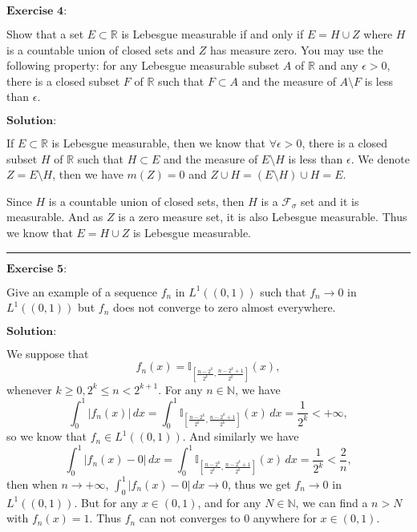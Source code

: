\documentclass[12pt]{article}
\begin{document}
$\textbf{Exercise 4:}$

Show that a set $E \subset \mathbb{R}$ is Lebesgue measurable if and only if $E = H \cup Z$ where $H$ is a countable union of closed sets and $Z$ has measure zero. You may use the following property: for any Lebesgue measurable subset $A$ of $\mathbb{R}$ and any $\epsilon > 0$, there is a closed subset $F$ of $\mathbb{R}$ such that $F \subset A$ and the measure of $A \setminus F$ is less than $\epsilon$.

\vspace{8pt}
$\textbf{Solution:}$

If $E \subset \mathbb{R}$ is Lebesgue measurable, then we know that $\forall \epsilon > 0$, there is a closed subset $H$ of $\mathbb{R}$ such that $H \subset E$ and the measure of $E \setminus H$ is less than $\epsilon$. We denote $Z = E \setminus H$, then we have $m(Z) = 0$ and $Z \cup H = (E \setminus H) \cup H = E$. 

Since $H$ is a countable union of closed sets, then $H$ is a $\mathcal{F}_{\sigma}$ set and it is measurable. And as $Z$ is a zero measure set, it is also Lebesgue measurable. Thus we know that $E = H \cup Z$ is Lebesgue measurable.

\noindent\rule[0.25\baselineskip]{\textwidth}{0.5pt}

$\textbf{Exercise 5:}$

Give an example of a sequence $f_{n}$ in $L^{1} ((0, 1))$ such that $f_{n} \to 0$ in $L^{1}((0, 1))$ but $f_{n}$ does not converge to zero almost everywhere.

\vspace{8pt}
$\textbf{Solution:}$

We suppose that
\begin{equation*}
    f_{n} (x) = \mathbb{I}_{[\frac{n - 2^{k}}{2^{k}}, \frac{n - 2^{k} + 1}{2^{k}}]} (x),
\end{equation*}
whenever $k \geq 0, 2^{k} \leq n < 2^{k + 1}$. For any $n \in \mathbb{N}$, we have
\begin{equation*}
    \int_{0}^{1} | f_{n} (x) | \, d x = \int_{0}^{1} \mathbb{I}_{[\frac{n - 2^{k}}{2^{k}}, \frac{n - 2^{k} + 1}{2^{k}}]} (x) \, d x  = \frac{1}{2^{k}} < +\infty,
\end{equation*}
so we know that $f_{n} \in L^{1}((0, 1))$. And similarly we have
\begin{equation*}
    \int_{0}^{1} | f_{n} (x) - 0 | \, d x = \int_{0}^{1} \mathbb{I}_{[\frac{n - 2^{k}}{2^{k}}, \frac{n - 2^{k} + 1}{2^{k}}]} (x) \, d x  = \frac{1}{2^{k}} < \frac{2}{n},
\end{equation*}
then when $n \to + \infty$, $\int_{0}^{1} | f_{n} (x) - 0 | \, d x \to 0$, thus we get $f_{n} \to 0$ in $L^{1}((0, 1))$. But for any $x \in (0, 1)$, and for any $N \in \mathbb{N}$, we can find a $n > N$ with $f_{n} (x) = 1$. Thus $f_{n}$ can not converges to $0$ anywhere for $x \in (0, 1)$.
\end{document}
